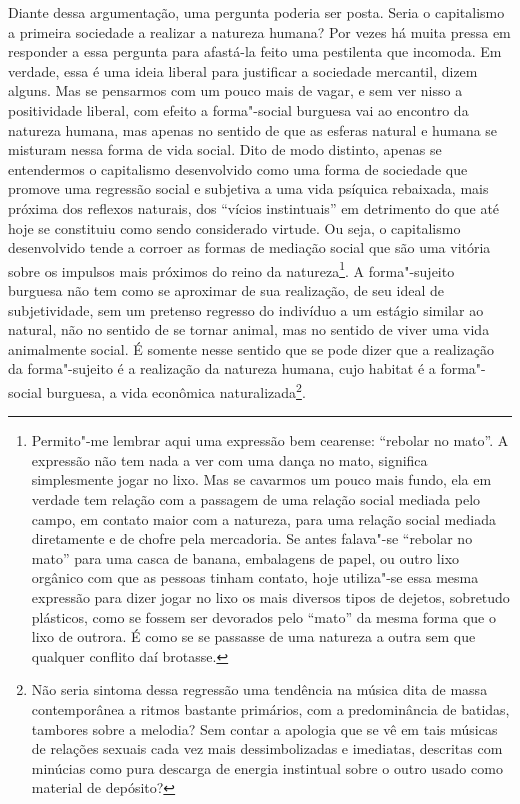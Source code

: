 {Diante dessa argumentação, uma pergunta poderia ser posta. Seria o
capitalismo a primeira sociedade a realizar a natureza humana? Por vezes
há muita pressa em responder a essa pergunta para afastá-la feito uma
pestilenta que incomoda. Em verdade, essa é uma ideia liberal para
justificar a sociedade mercantil, dizem alguns. Mas se pensarmos com um
pouco mais de vagar, e sem ver nisso a positividade liberal, com efeito
a forma"-social burguesa vai ao encontro da natureza humana, mas apenas
no sentido de que as esferas natural e humana se misturam nessa forma de
vida social. Dito de modo distinto, apenas se entendermos o capitalismo
desenvolvido como uma forma de sociedade que promove uma regressão
social e subjetiva a uma vida psíquica rebaixada, mais próxima dos
reflexos naturais, dos ``vícios instintuais'' em detrimento do que até
hoje se constituiu como sendo considerado virtude. Ou seja, o
capitalismo desenvolvido tende a corroer as formas de mediação social
que são uma vitória sobre os impulsos mais próximos do reino da
natureza\footnote{Permito"-me lembrar aqui uma expressão bem cearense:
  ``rebolar no mato''. A expressão não tem nada a ver com uma dança no
  mato, significa simplesmente jogar no lixo. Mas se cavarmos um pouco
  mais fundo, ela em verdade tem relação com a passagem de uma relação
  social mediada pelo campo, em contato maior com a natureza, para uma
  relação social mediada diretamente e de chofre pela mercadoria. Se
  antes falava"-se ``rebolar no mato'' para uma casca de banana,
  embalagens de papel, ou outro lixo orgânico com que as pessoas tinham
  contato, hoje utiliza"-se essa mesma expressão para dizer jogar no lixo
  os mais diversos tipos de dejetos, sobretudo plásticos, como se fossem
  ser devorados pelo ``mato'' da mesma forma que o lixo de outrora. É
  como se se passasse de uma natureza a outra sem que qualquer conflito
  daí brotasse.}. A forma"-sujeito burguesa não tem como se aproximar de
sua realização, de seu ideal de subjetividade, sem um pretenso regresso
do indivíduo a um estágio similar ao natural, não no sentido de se
tornar animal, mas no sentido de viver uma vida animalmente social. É
somente nesse sentido que se pode dizer que a realização da
forma"-sujeito é a realização da natureza humana, cujo habitat é a
forma"-social burguesa, a vida econômica naturalizada\footnote{Não seria
  sintoma dessa regressão uma tendência na música dita de massa
  contemporânea a ritmos bastante primários, com a predominância de
  batidas, tambores sobre a melodia? Sem contar a apologia que se vê em
  tais músicas de relações sexuais cada vez mais dessimbolizadas e
  imediatas, descritas com minúcias como pura descarga de energia
  instintual sobre o outro usado como material de depósito?}.

}
